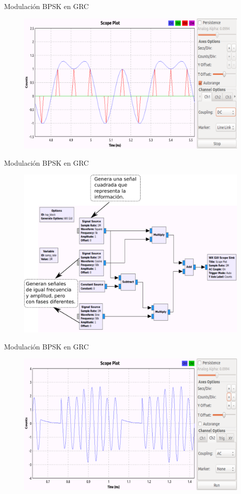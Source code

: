 \begin{frame}{Modulación BPSK en GRC}
\begin{figure}[H]
\centering
\includegraphics[width=\textwidth]{lab5/pdf/lab5_3.pdf}
\end{figure}
\end{frame}

\begin{frame}{Modulación BPSK en GRC}
\begin{figure}[H]
\centering
\includegraphics[width=.8\textwidth]{lab5/pdf/lab5_4.pdf}
\end{figure}
\end{frame}

\begin{frame}{Modulación BPSK en GRC}
\begin{figure}[H]
\centering
\includegraphics[width=\textwidth]{lab5/pdf/lab5_5.pdf}
\end{figure}
\end{frame}
